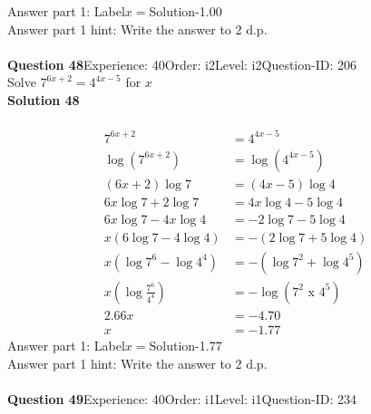 \documentclass{article}
\begin{document}
Answer part 1: \hspace{10pt}Label\hspace{10pt}$x=$\hspace{10pt}Solution\hspace{10pt}-1.00\\
Answer part 1 hint: \hspace{15pt}Write the answer to 2 d.p.\\
\\[4pt]
\noindent\textbf{Question 48}\hspace{20pt}Experience: 40\hspace{20pt}Order: i2\hspace{20pt}Level: i2\hspace{20pt}Question-ID: 206\\[2pt]
Solve $7^{6x+2}=4^{4x-5}$ for $x$\\[4pt]
\noindent\textbf{Solution 48}\\[2pt]
\\[-35pt]\begin{align*}
7^{6x+2}&=4^{4x-5}\\[2pt]
\log(7^{6x+2})&=\log(4^{4x-5})\\[2pt]
(6x+2)\log7&=(4x-5)\log4\\[2pt]
6x\log7+2\log7&=4x\log4-5\log4\\[2pt]
6x\log7-4x\log4&=-2\log7-5\log4\\[2pt]
x(6\log7-4\log4)&=-(2\log7+5\log4)\\[2pt]
x(\log7^6-\log4^4)&=-(\log7^2+\log4^5)\\[2pt]
x\left(\log\displaystyle\frac{7^6}{4^4}\right)&=-\log(7^2 \,\, \text{x} \,\, 4^5)\\[2pt]
2.66x&=-4.70\\[2pt]
x&=-1.77
\end{align*}
Answer part 1: \hspace{10pt}Label\hspace{10pt}$x=$\hspace{10pt}Solution\hspace{10pt}-1.77\\
Answer part 1 hint: \hspace{15pt}Write the answer to 2 d.p.\\
\\[4pt]
\noindent\textbf{Question 49}\hspace{20pt}Experience: 40\hspace{20pt}Order: i1\hspace{20pt}Level: i1\hspace{20pt}Question-ID: 234\\[2pt]
\end{document}
